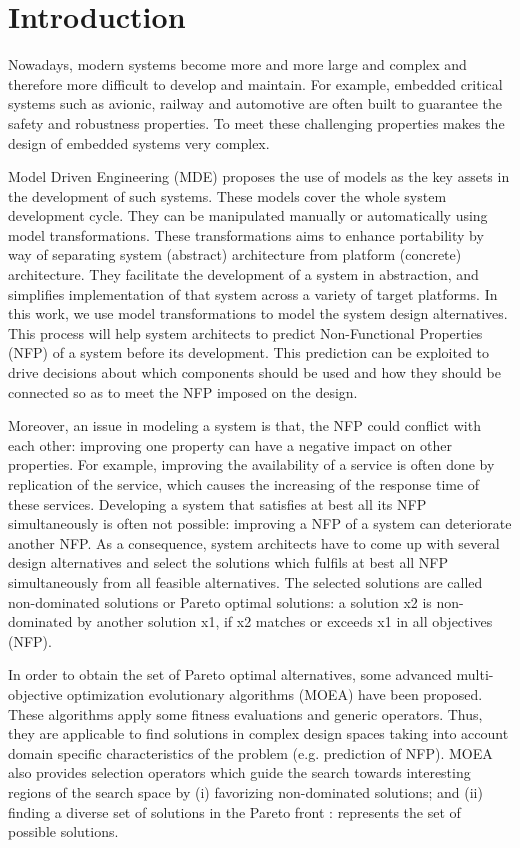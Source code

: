 \documentclass[conference]{IEEEtran}
\begin{document}
\IEEEpeerreviewmaketitle

\section{Introduction}
Nowadays, modern systems become more and more large and complex and therefore more difficult to develop and maintain. For example, embedded critical systems such as avionic, railway and automotive are often built to guarantee the safety and robustness properties. To meet these challenging properties makes the design of embedded systems very complex.

Model Driven Engineering (MDE) proposes the use of models as the key assets in the development of such systems. These models cover the whole system development cycle. They can be manipulated manually or automatically using model transformations. These transformations aims to enhance portability by way of separating system (abstract) architecture from platform (concrete) architecture. They facilitate the development of a system in abstraction, and simplifies implementation of that system across a variety of target platforms. In this work, we use model transformations to model the system design alternatives. This process will help system architects to predict Non-Functional Properties (NFP) of a system before its development\cite{1291833}. This prediction can be exploited to drive decisions about which components should be used and how they should be connected so as to meet the NFP imposed on the design.

Moreover, an issue in modeling a system is that, the NFP could conflict with each other: improving one property can have a negative impact on other properties. For example, improving the availability of a service is often done by replication of the service, which causes the increasing of the response time of these services\cite{Yu:2001:CLA:502059.502038}. Developing a system that satisfies at best all its NFP simultaneously is often not possible: improving a NFP of a system can deteriorate another NFP. As a consequence, system architects have to come up with several design alternatives and select the solutions which fulfils at best all NFP\cite{Coello98acomprehensive} simultaneously from all feasible alternatives. The selected solutions are called non-dominated solutions or Pareto optimal solutions: a solution x2 is non-dominated by another solution x1, if x2 matches or exceeds x1 in all objectives (NFP).

In order to obtain the set of Pareto optimal alternatives, some advanced multi-objective optimization evolutionary algorithms (MOEA) have been proposed. These algorithms apply some fitness evaluations and generic operators. Thus, they are applicable to find solutions in complex design spaces taking into account domain specific characteristics of the problem (e.g. prediction of NFP). MOEA also provides selection operators which guide the search towards interesting regions of the search space by (i) favorizing non-dominated solutions; and (ii) finding a diverse set of solutions in the Pareto front : represents the set of possible solutions.
\end{document}
